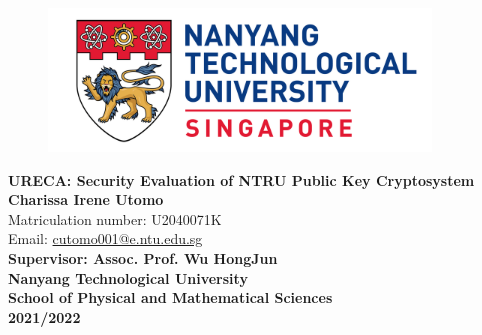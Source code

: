 \begin{titlepage}
\begin{figure}[!t]
\centering
\includegraphics[width = 4in]{Title/logo.png}\\[1in]
\end{figure}

\centering
\LARGE{\textbf{URECA: Security Evaluation of NTRU Public Key Cryptosystem}}\\[1.5in]

\Large{\textbf{Charissa Irene Utomo}}\\
\normalsize{Matriculation number: U2040071K}\\
\normalsize{Email: \href{mailto:cutomo001@e.ntu.edu.sg}{cutomo001@e.ntu.edu.sg}} \\[0.5in]

\large{\textbf{Supervisor: Assoc. Prof. Wu HongJun}}\\[0.5in]
\textbf{Nanyang Technological University\\School of Physical and Mathematical Sciences}\\[0.5in]

\textbf{2021/2022}


\newpage
\end{titlepage}
